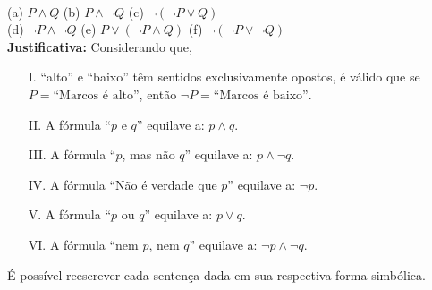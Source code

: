 \documentclass[12pt, a4paper, onecolumn]{exam}
\begin{document}
\begin{questions}
    
    \begin{solution}                            \\[0.5em]
        (a) \( P \wedge Q \)                    \hfill
        (b) \( P \wedge \neg Q \)               \hfill
        (c) \( \neg ( \neg P \vee Q ) \)        \\[0.5em]
        (d) \( \neg P \wedge \neg Q \)          \hfill
        (e) \( P \vee ( \neg P \wedge Q ) \)    \hfill
        (f) \( \neg ( \neg P \vee \neg Q ) \)   \\[1em]
        \textbf{Justificativa:} Considerando que,
        \begin{itemize}
            \item[I.] “alto” e “baixo” têm sentidos exclusivamente opostos, é válido que se \( P = \text{“Marcos é alto”} \), então \( \neg P = \text{“Marcos é baixo”} \).
            \item[II.] A fórmula “\(p\) e \(q\)” equilave a: \( p \wedge q\).
            \item[III.] A fórmula “\(p\), mas não \(q\)” equilave a: \( p \wedge \neg q\).
            \item[IV.] A fórmula “Não é verdade que \(p\)” equilave a: \( \neg p \).
            \item[V.] A fórmula “\(p\) ou \(q\)” equilave a: \( p \vee q\).
            \item[VI.] A fórmula “nem \(p\), nem \(q\)” equilave a: \( \neg p \wedge \neg q \).
        \end{itemize}
        É possível reescrever cada sentença dada em sua respectiva forma simbólica. 
    \end{solution}


\end{questions}
\end{document}
